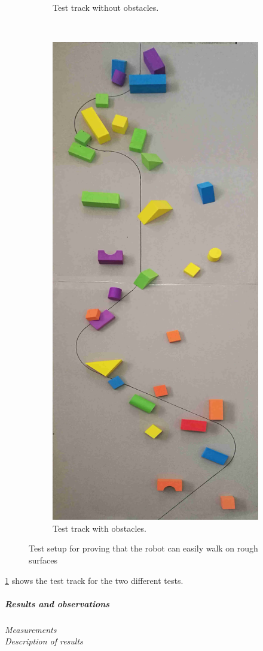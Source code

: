 \begin{figure}[H]
\begin{subfigure}[t]{0.5\textwidth}
        \caption{Test track without obstacles.}
    \end{subfigure}%
    ~ 
    \begin{subfigure}[t]{0.5\textwidth}
        \centering
        \includegraphics[scale = 1]{pics/Res4.jpg}
        \caption{Test track with obstacles.}
    \end{subfigure}
    \caption{Test setup for proving that the robot can easily walk on rough surfaces}
    \label{fig:Res4}
\end{figure}
\Figure \ref{fig:Res4} shows the test track for the two different tests.
\subparagraph{Results and observations}
\textit{Measurements}\\
\textit{Description of results}\\

